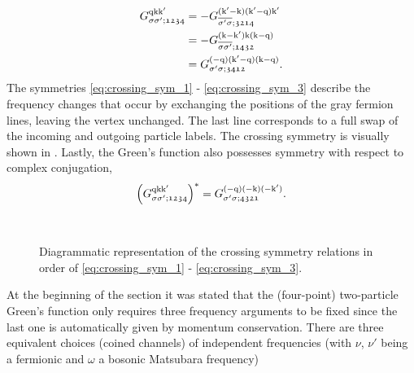 \documentclass[../../main.tex]{subfiles}
\begin{document}
\begin{subequations}
\begin{align}
	G_{\sigma\sigma';\mathfrak{1234}}^{\text{q}\text{k}\text{k}'}&= -G_{\overline{\sigma'\sigma};\mathfrak{3214}}^{(\text{k}'-\text{k})(\text{k}'-\text{q})\text{k}'}\label{eq:crossing_sym_1}\\
	&= -G_{\overline{\sigma\sigma'};\mathfrak{1432}}^{(\text{k}-\text{k}')\text{k}(\text{k}-\text{q})}\label{eq:crossing_sym_2}\\
	&= G_{\sigma'\sigma;\mathfrak{3412}}^{(-\text{q})(\text{k}'-\text{q})(\text{k}-\text{q})}.\label{eq:crossing_sym_3}
\end{align}
\end{subequations}
The symmetries \eqref{eq:crossing_sym_1} - \eqref{eq:crossing_sym_3} describe the frequency changes that occur by exchanging the positions of the gray fermion lines, leaving the vertex unchanged. The last line corresponds to a full swap of the incoming and outgoing particle labels. The crossing symmetry is visually shown in . Lastly, the Green's function also possesses symmetry with respect to complex conjugation,
\begin{align}
	\left (G_{\sigma\sigma';\mathfrak{1234}}^{\text{q}\text{k}\text{k}'}\right )^*=G_{\sigma'\sigma;\mathfrak{4321}}^{(-\text{q})(-\text{k})(-\text{k}')}.
\end{align}
\begin{figure}[h]
  \centering
  \vspace{0.5cm}\\
  \caption{Diagrammatic representation of the crossing symmetry relations in order of \eqref{eq:crossing_sym_1} - \eqref{eq:crossing_sym_3}.}
  \label{fig:two_particle_green_crossing_symmetry}
\end{figure}
At the beginning of the section it was stated that the (four-point) two-particle Green's function only requires three frequency arguments to be fixed since the last one is automatically given by momentum conservation. There are three equivalent choices (coined channels) of independent frequencies (with $\nu$, $\nu'$ being a fermionic and $\omega$ a bosonic Matsubara frequency)
\end{document}
